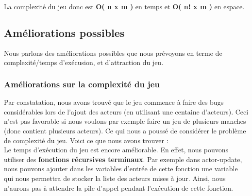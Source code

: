 \documentclass[a4paper]{article}
\begin{document}
La complexité du jeu donc est \textbf{O( n x m )} en temps et \textbf{O( n! x m )} en espace.

\subsection{Améliorations possibles}
Nous parlons des améliorations possibles que nous prévoyons en terme de complexité/temps d'exécusion, et d'attraction du jeu.
\subsubsection{Améliorations sur la complexité du jeu}
Par constatation, nous avons trouvé que le jeu commence à faire des bugs considérables lors de l'ajout des acteurs (en utilisant une centaine d'acteurs). Ceci n'est pas favorable si nous voulons par exemple faire un jeu de plusieurs manches (donc contient plusieurs acteurs). Ce qui nous a poussé de considérer le problème de complexité du jeu. Voici ce que nous avons trouver :\\


Le temps d'exécution du jeu est encore améliorable. En effet, nous pouvons utiliser des \textbf{fonctions récursives terminaux}. Par exemple dans actor-update, nous pouvons ajouter dans les variables d'entrée de cette fonction une variable qui nous permettra de stocker la liste des acteurs mises à jour. Ainsi, nous n'aurons pas à attendre la pile d'appel pendant l'exécution de cette fonction.\\
\end{document}
